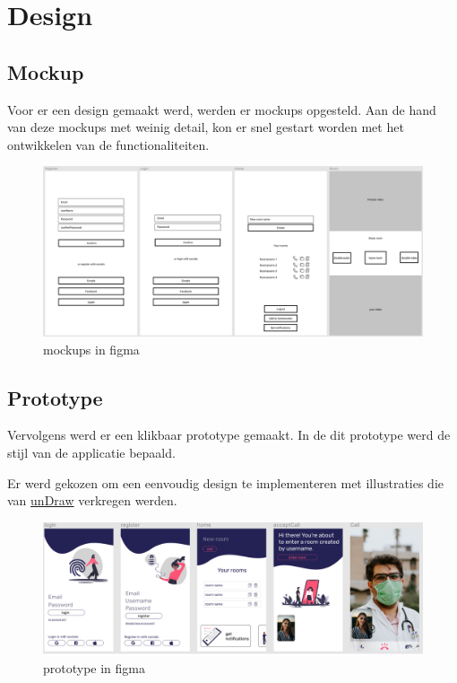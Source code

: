 \section{Design}
		\subsection{Mockup}
					
			Voor er een design gemaakt werd, werden er mockups opgesteld.
			Aan de hand van deze mockups met weinig detail, kon er snel gestart worden met het ontwikkelen van de functionaliteiten. \autocite{Tate2019}
			\begin{figure}[H]
				\centering
				\includegraphics[width=140mm]{./img/mockup-poc.png}{}
				\caption{mockups in figma}
			\end{figure}
		
		
		\subsection{Prototype}
		
			Vervolgens werd er een klikbaar prototype gemaakt. In de dit prototype werd de stijl van de applicatie bepaald.
			
			Er werd gekozen om een eenvoudig design te implementeren met illustraties die van \href{https://undraw.co/}{unDraw} verkregen werden.
			
			\begin{figure}[H]
				\centering
				\includegraphics[width=140mm]{./img/prototype-poc.png}{}
				\caption{prototype in figma}
			\end{figure}
			
